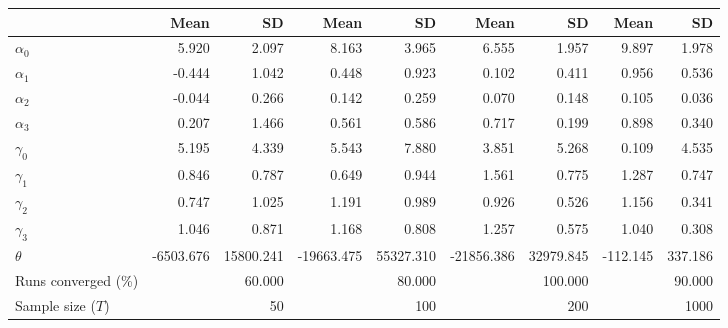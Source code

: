 
\begin{tabular}[t]{lrrrrrrrr}
\toprule
  & Mean & SD & Mean  & SD  & Mean   & SD   & Mean    & SD   \\
\midrule
$\alpha_{0}$ & 5.920 & 2.097 & 8.163 & 3.965 & 6.555 & 1.957 & 9.897 & 1.978\\
$\alpha_{1}$ & -0.444 & 1.042 & 0.448 & 0.923 & 0.102 & 0.411 & 0.956 & 0.536\\
$\alpha_{2}$ & -0.044 & 0.266 & 0.142 & 0.259 & 0.070 & 0.148 & 0.105 & 0.036\\
$\alpha_{3}$ & 0.207 & 1.466 & 0.561 & 0.586 & 0.717 & 0.199 & 0.898 & 0.340\\
$\gamma_{0}$ & 5.195 & 4.339 & 5.543 & 7.880 & 3.851 & 5.268 & 0.109 & 4.535\\
$\gamma_{1}$ & 0.846 & 0.787 & 0.649 & 0.944 & 1.561 & 0.775 & 1.287 & 0.747\\
$\gamma_{2}$ & 0.747 & 1.025 & 1.191 & 0.989 & 0.926 & 0.526 & 1.156 & 0.341\\
$\gamma_{3}$ & 1.046 & 0.871 & 1.168 & 0.808 & 1.257 & 0.575 & 1.040 & 0.308\\
$\theta$ & -6503.676 & 15800.241 & -19663.475 & 55327.310 & -21856.386 & 32979.845 & -112.145 & 337.186\\
Runs converged (\%) &  & 60.000 &  & 80.000 &  & 100.000 &  & 90.000\\
Sample size ($T$) &  & 50 &  & 100 &  & 200 &  & 1000\\
\bottomrule
\end{tabular}
